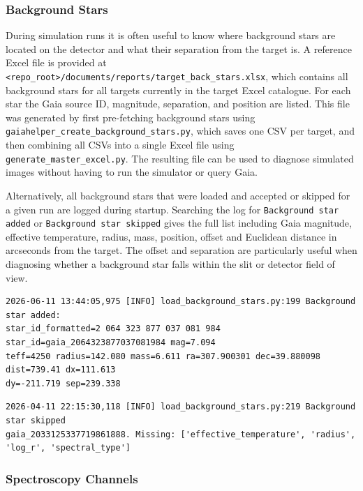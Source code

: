 \subsubsection{Background Stars}
\label{sec:background_star_log}

During simulation runs it is often useful to know where background stars are located on the detector and what their separation from the target is. A reference Excel file is provided at \texttt{<repo\_root>/documents/reports\allowbreak/target\_back\_stars.xlsx}, which contains all background stars for all targets currently in the target Excel catalogue. For each star the Gaia source ID, magnitude, separation, and position are listed. This file was generated by first pre-fetching background stars using \texttt{gaiahelper\_create\_background\_stars.py}, which saves one CSV per target, and then combining all CSVs into a single Excel file using \texttt{generate\_master\_excel.py}. The resulting file can be used to diagnose simulated images without having to run the simulator or query Gaia.

Alternatively, all background stars that were loaded and accepted or skipped for a given run are logged during startup. Searching the log for \texttt{Background star added} or \texttt{Background star skipped} gives the full list including Gaia magnitude, effective temperature, radius, mass, position, offset and Euclidean distance in arcseconds from the target. The offset and separation are particularly useful when diagnosing whether a background star falls within the slit or detector field of view.

\begin{verbatim}
2026-06-11 13:44:05,975 [INFO] load_background_stars.py:199 Background star added: 
star_id_formatted=2 064 323 877 037 081 984 star_id=gaia_2064323877037081984 mag=7.094 
teff=4250 radius=142.080 mass=6.611 ra=307.900301 dec=39.880098 dist=739.41 dx=111.613 
dy=-211.719 sep=239.338
\end{verbatim}

\begin{verbatim}
2026-04-11 22:15:30,118 [INFO] load_background_stars.py:219 Background star skipped 
gaia_2033125337719861888. Missing: ['effective_temperature', 'radius', 
'log_r', 'spectral_type']
\end{verbatim}

\subsubsection{Spectroscopy Channels}


